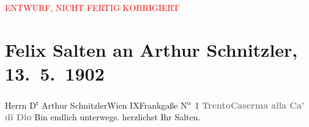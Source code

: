 
\begin{center}
            \textcolor{red}{ENTWURF, NICHT FERTIG KORRIGIERT}
                      \end{center}
            
         \renewcommand{\erwaehnteOrte}{Orte: Frankgasse, IX., Alsergrund, Kaserne Ca’ di Dio, Trient, Wien}
         \renewcommand{\erwaehnteWerke}{}
               \section[Felix Salten an Arthur Schnitzler, 13. 5. 1902]{ Felix Salten an Arthur Schnitzler, 13. 5. 1902}\nopagebreak{}\rehead{ }\begin{ledgroupsized}[t]{13cm}\normalsize\beginnumbering \toendnotes[C]{\smallbreak\pagebreak[2]} 
\pstart{}{\pb}Herrn D\textsuperscript{r} Arthur Schnitzler\pend{}\pstart{}Wien IX\pend{}\pstart{}Frankgaße N\textsuperscript{o} 1\pend{}{\bigskip}\pstart
           \noindent{}{\pb}\textcolor{gray}{\textbf{Trento}}\hfill \textcolor{gray}{\textbf{Caserma alla Ca’ di
                           Dio}}\pend
           \pstart
           Bin endlich unterwegs.\pend
           \pstart herzlichst Ihr \spacefill\mbox{Salten.}\pend{}
         
         \endnumbering{}\end{ledgroupsized}\begin{anhang}\end{anhang}\newcommand{\dateiname}{L03329}\newcommand{\titel}{Felix Salten an Arthur Schnitzler, 13. 5. 1902}\newcommand{\editorInnen}{Martin Anton Müller und Laura Untner}
      